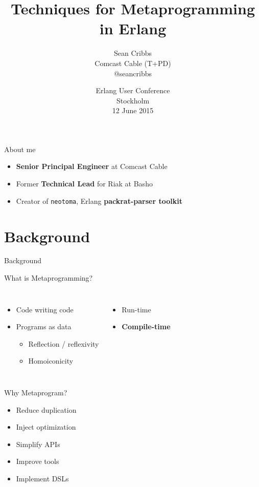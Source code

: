 \documentclass[c]{beamer}
\title[EUC 2015]{Techniques for Metaprogramming in Erlang}
\author[Sean Cribbs]{\Large Sean Cribbs \\
  \small{Comcast Cable (T+PD) \\ @seancribbs}}
\date[EUC 2015]{Erlang User Conference \\ Stockholm \\
  12 June 2015}
\begin{document}
\begin{frame}
  \maketitle
\end{frame}

\begin{frame}{About me}
  \begin{itemize}
  \item \textbf{Senior Principal Engineer} at Comcast Cable
  \item Former \textbf{Technical Lead} for Riak at Basho
  \item Creator of \texttt{neotoma}, Erlang \textbf{packrat-parser toolkit}
  \end{itemize}
\end{frame}

\section{Background}

\begin{frame}[c]
  \begin{center}
    \Huge Background
  \end{center}
\end{frame}

\begin{frame}{What is Metaprogramming?}
  \begin{columns}[t]
      \begin{itemize}
      \item Code writing code
      \item Programs as data
        \begin{itemize}
        \item Reflection / reflexivity
        \item Homoiconicity
        \end{itemize}
      \end{itemize}
    \pause
      \begin{itemize}
      \item Run-time\pause
      \item \textbf{Compile-time}
      \end{itemize}
  \end{columns}
\end{frame}

\begin{frame}{Why Metaprogram?}
  \begin{itemize}
  \item Reduce duplication
  \item Inject optimization
  \item Simplify APIs
  \item Improve tools
  \item Implement DSLs
  \end{itemize}
\end{frame}
\end{document}
